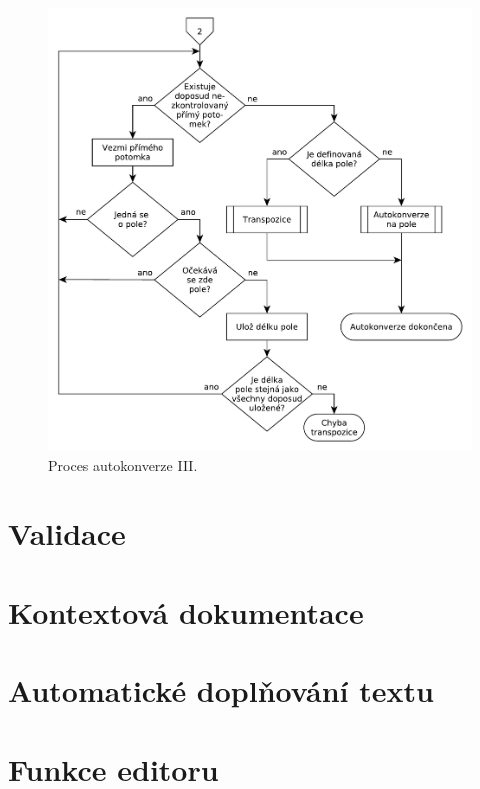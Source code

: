 \documentclass[FM,bw,DP]{tulthesis}
\begin{document}
\begin{figure}[h]
	\centering
    \includegraphics[width=\textwidth]{../img/autoconversion_process_3.pdf}
    \caption{Proces autokonverze III.}
	\label{img:autoconversion_process_3}
\end{figure}


\section{Validace}

\section{Kontextová dokumentace}

\section{Automatické doplňování textu}

\section{Funkce editoru}
\end{document}
